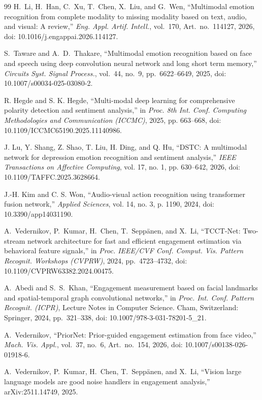 \documentclass[journal]{IEEEtran}
\begin{document}
\begin{thebibliography}{99}
H.~Li, H.~Han, C.~Xu, T.~Chen, X.~Liu, and G.~Wen, ``Multimodal emotion recognition from complete modality to missing modality based on text, audio, and visual: A review,'' \emph{Eng. Appl. Artif. Intell.}, vol.~170, Art.~no.~114127, 2026, doi: 10.1016/j.engappai.2026.114127.

S.~Taware and A.~D.~Thakare, ``Multimodal emotion recognition based on face and speech using deep convolution neural network and long short term memory,'' \emph{Circuits Syst. Signal Process.}, vol.~44, no.~9, pp.~6622--6649, 2025, doi: 10.1007/s00034-025-03080-2.

R. Hegde and S. K. Hegde, ``Multi-modal deep learning for comprehensive polarity detection and sentiment analysis,'' in \emph{Proc. 8th Int. Conf. Computing Methodologies and Communication (ICCMC)}, 2025, pp. 663--668, doi: 10.1109/ICCMC65190.2025.11140986.

J. Lu, Y. Shang, Z. Shao, T. Liu, H. Ding, and Q. Hu, ``DSTC: A multimodal network for depression emotion recognition and sentiment analysis,'' \emph{IEEE Transactions on Affective Computing}, vol. 17, no. 1, pp. 630--642, 2026, doi: 10.1109/TAFFC.2025.3628664.

J.-H. Kim and C. S. Won, ``Audio-visual action recognition using transformer fusion network,'' \emph{Applied Sciences}, vol. 14, no. 3, p. 1190, 2024, doi: 10.3390/app14031190.


A.~Vedernikov, P.~Kumar, H.~Chen, T.~Sepp\"{a}nen, and X.~Li, ``TCCT-Net: Two-stream network architecture for fast and efficient engagement estimation via behavioral feature signals,'' in \emph{Proc. IEEE/CVF Conf. Comput. Vis. Pattern Recognit. Workshops (CVPRW)}, 2024, pp.~4723--4732, doi: 10.1109/CVPRW63382.2024.00475.

A.~Abedi and S.~S.~Khan, ``Engagement measurement based on facial landmarks and spatial-temporal graph convolutional networks,'' in \emph{Proc. Int. Conf. Pattern Recognit. (ICPR)}, Lecture Notes in Computer Science. Cham, Switzerland: Springer, 2024, pp.~321--338, doi: 10.1007/978-3-031-78201-5\_21.

A.~Vedernikov, ``PriorNet: Prior-guided engagement estimation from face video,'' \emph{Mach. Vis. Appl.}, vol.~37, no.~6, Art.~no.~154, 2026, doi: 10.1007/s00138-026-01918-6.

A.~Vedernikov, P.~Kumar, H.~Chen, T.~Sepp\"{a}nen, and X.~Li, ``Vision large language models are good noise handlers in engagement analysis,'' arXiv:2511.14749, 2025.


\end{thebibliography}
\end{document}
